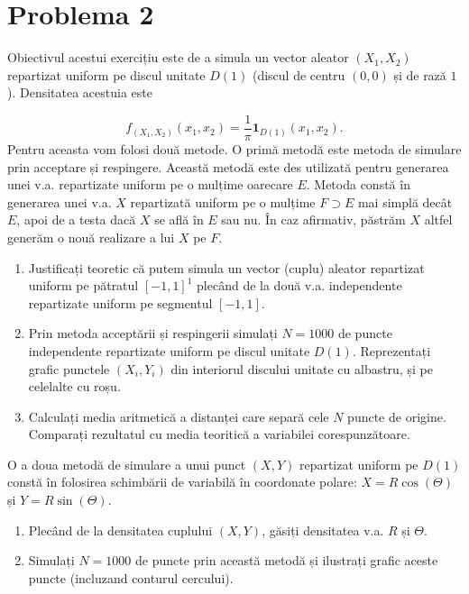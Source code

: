 \documentclass[]{article}
\begin{document}
\section{Problema 2}\label{problema-2}

Obiectivul acestui exercițiu este de a simula un vector aleator
\((X_1,X_2)\) repartizat uniform pe discul unitate \(D(1)\) (discul de
centru \((0,0)\) și de rază \(1\)). Densitatea acestuia este

\[
f_{(X_1,X_2)}(x_1,x_2) = \frac{1}{\pi}\mathbf{1}_{D(1)}(x_1,x_2).
\] Pentru aceasta vom folosi două metode. O primă metodă este metoda de
simulare prin acceptare și respingere. Această metodă este des utilizată
pentru generarea unei v.a. repartizate uniform pe o mulțime oarecare
\(E\). Metoda constă în generarea unei v.a. \(X\) repartizată uniform pe
o mulțime \(F\supset E\) mai simplă decât \(E\), apoi de a testa dacă
\(X\) se află în \(E\) sau nu. În caz afirmativ, păstrăm \(X\) altfel
generăm o nouă realizare a lui \(X\) pe \(F\).

\begin{enumerate}
\def\labelenumi{\arabic{enumi}.}
\item
  Justificați teoretic că putem simula un vector (cuplu) aleator
  repartizat uniform pe pătratul \([-1,1]^1\) plecând de la două v.a.
  independente repartizate uniform pe segmentul \([-1,1]\).
\item
  Prin metoda acceptării și respingerii simulați \(N=1000\) de puncte
  independente repartizate uniform pe discul unitate \(D(1)\).
  Reprezentați grafic punctele \((X_i,Y_i)\) din interiorul discului
  unitate cu albastru, și pe celelalte cu roșu.
\item
  Calculați media aritmetică a distanței care separă cele \(N\) puncte
  de origine. Comparați rezultatul cu media teoritică a variabilei
  corespunzătoare.
\end{enumerate}

O a doua metodă de simulare a unui punct \((X,Y)\) repartizat uniform pe
\(D(1)\) constă în folosirea schimbării de variabilă în coordonate
polare: \(X=R\cos(\Theta)\) și \(Y=R\sin(\Theta)\).

\begin{enumerate}
\def\labelenumi{\arabic{enumi}.}
\setcounter{enumi}{3}
\item
  Plecând de la densitatea cuplului \((X,Y)\), găsiți densitatea v.a.
  \(R\) și \(\Theta\).
\item
  Simulați \(N=1000\) de puncte prin această metodă și ilustrați grafic
  aceste puncte (incluzand conturul cercului).
\end{enumerate}
\end{document}
